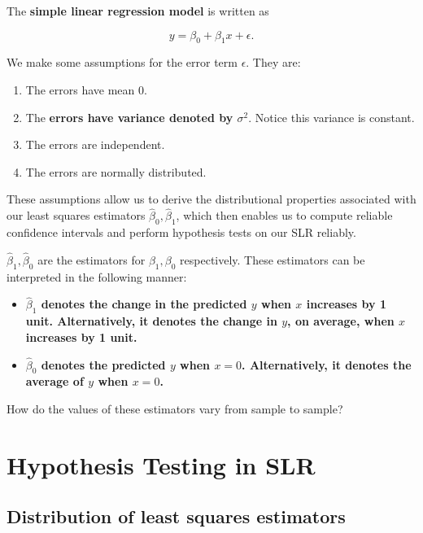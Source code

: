\documentclass[
]{book}
\providecommand{\tightlist}{%
  \setlength{\itemsep}{0pt}\setlength{\parskip}{0pt}}
\begin{document}
The \textbf{simple linear regression model} is written as

\begin{equation}
y=\beta_0+\beta_{1} x + \epsilon. 
\label{eq:4SLRmod}
\end{equation}

We make some assumptions for the error term \(\epsilon\). They are:

\begin{enumerate}
\def\labelenumi{\arabic{enumi}.}
\tightlist
\item
  The errors have mean 0.
\item
  The \textbf{errors have variance denoted by \(\sigma^2\)}. Notice this variance is constant.
\item
  The errors are independent.
\item
  The errors are normally distributed.
\end{enumerate}

These assumptions allow us to derive the distributional properties associated with our least squares estimators \(\hat{\beta}_0, \hat{\beta}_1\), which then enables us to compute reliable confidence intervals and perform hypothesis tests on our SLR reliably.

\(\hat{\beta}_1,\hat{\beta}_0\) are the estimators for \(\beta_1,\beta_0\) respectively. These estimators can be interpreted in the following manner:

\begin{itemize}
\tightlist
\item
  \textbf{\(\hat{\beta}_1\) denotes the change in the predicted \(y\) when \(x\) increases by 1 unit. Alternatively, it denotes the change in \(y\), on average, when \(x\) increases by 1 unit.}
\item
  \textbf{\(\hat{\beta}_0\) denotes the predicted \(y\) when \(x=0\). Alternatively, it denotes the average of \(y\) when \(x=0\).}
\end{itemize}

How do the values of these estimators vary from sample to sample?

\hypertarget{hypothesis-testing-in-slr}{%
\section{Hypothesis Testing in SLR}\label{hypothesis-testing-in-slr}}

\hypertarget{distribution-of-least-squares-estimators}{%
\subsection{Distribution of least squares estimators}\label{distribution-of-least-squares-estimators}}
\end{document}
